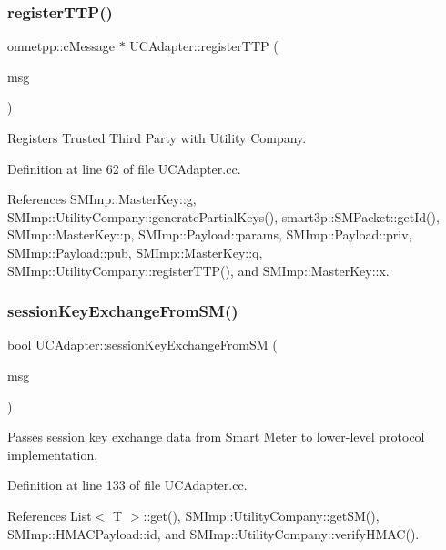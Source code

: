 \subsubsection{\texorpdfstring{register\+T\+T\+P()}{registerTTP()}}
{\footnotesize\ttfamily omnetpp\+::c\+Message $\ast$ U\+C\+Adapter\+::register\+T\+TP (\begin{DoxyParamCaption}\item[{omnetpp\+::c\+Message $\ast$}]{msg }\end{DoxyParamCaption})}

Registers Trusted Third Party with Utility Company. 

Definition at line 62 of file U\+C\+Adapter.\+cc.



References S\+M\+Imp\+::\+Master\+Key\+::g, S\+M\+Imp\+::\+Utility\+Company\+::generate\+Partial\+Keys(), smart3p\+::\+S\+M\+Packet\+::get\+Id(), S\+M\+Imp\+::\+Master\+Key\+::p, S\+M\+Imp\+::\+Payload\+::params, S\+M\+Imp\+::\+Payload\+::priv, S\+M\+Imp\+::\+Payload\+::pub, S\+M\+Imp\+::\+Master\+Key\+::q, S\+M\+Imp\+::\+Utility\+Company\+::register\+T\+T\+P(), and S\+M\+Imp\+::\+Master\+Key\+::x.

\mbox{\label{classUCAdapter_a855d4b0354b46575b99e1c46b746e5ac}} 
\subsubsection{\texorpdfstring{session\+Key\+Exchange\+From\+S\+M()}{sessionKeyExchangeFromSM()}}
{\footnotesize\ttfamily bool U\+C\+Adapter\+::session\+Key\+Exchange\+From\+SM (\begin{DoxyParamCaption}\item[{omnetpp\+::c\+Message $\ast$}]{msg }\end{DoxyParamCaption})}

Passes session key exchange data from Smart Meter to lower-\/level protocol implementation. 

Definition at line 133 of file U\+C\+Adapter.\+cc.



References List$<$ T $>$\+::get(), S\+M\+Imp\+::\+Utility\+Company\+::get\+S\+M(), S\+M\+Imp\+::\+H\+M\+A\+C\+Payload\+::id, and S\+M\+Imp\+::\+Utility\+Company\+::verify\+H\+M\+A\+C().

